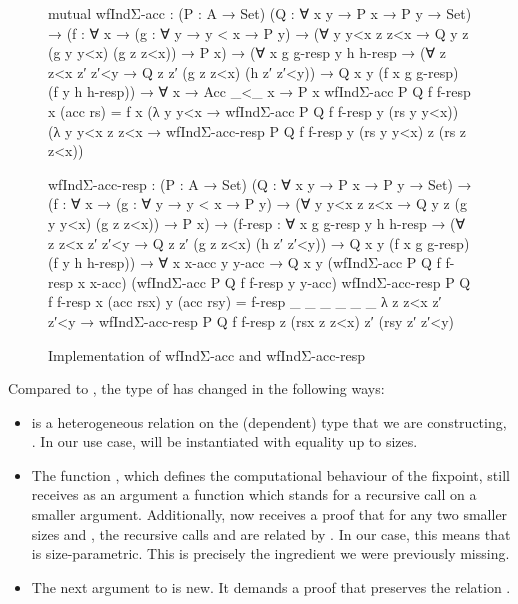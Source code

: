 \begin{figure}
  \centering
\begin{code}
mutual
  wfIndΣ-acc : (P : A → Set) (Q : ∀ x y → P x → P y → Set)
    → (f : ∀ x
        → (g : ∀ y → y < x → P y)
        → (∀ y y<x z z<x → Q y z (g y y<x) (g z z<x))
        → P x)
    → (∀ x g g-resp y h h-resp
        → (∀ z z<x z′ z′<y → Q z z′ (g z z<x) (h z′ z′<y))
        → Q x y (f x g g-resp) (f y h h-resp))
    → ∀ x → Acc _<_ x → P x
  wfIndΣ-acc P Q f f-resp x (acc rs)
    = f x
      (λ y y<x → wfIndΣ-acc P Q f f-resp y (rs y y<x))
      (λ y y<x z z<x
          → wfIndΣ-acc-resp P Q f f-resp y (rs y y<x) z (rs z z<x))

  wfIndΣ-acc-resp : (P : A → Set) (Q : ∀ x y → P x → P y → Set)
    → (f : ∀ x
        → (g : ∀ y → y < x → P y)
        → (∀ y y<x z z<x → Q y z (g y y<x) (g z z<x))
        → P x)
    → (f-resp : ∀ x g g-resp y h h-resp
        → (∀ z z<x z′ z′<y → Q z z′ (g z z<x) (h z′ z′<y))
        → Q x y (f x g g-resp) (f y h h-resp))
    → ∀ x x-acc y y-acc
    → Q x y
        (wfIndΣ-acc P Q f f-resp x x-acc)
        (wfIndΣ-acc P Q f f-resp y y-acc)
  wfIndΣ-acc-resp P Q f f-resp x (acc rsx) y (acc rsy)
    = f-resp _ _ _ _ _ _ λ z z<x z′ z′<y
        → wfIndΣ-acc-resp P Q f f-resp z (rsx z z<x) z′ (rsy z′ z′<y)
\end{code}

  \caption{Implementation of wfIndΣ-acc and wfIndΣ-acc-resp}
  \label{fig:wfIndΣ}
\end{figure}

Compared to , the type of  has changed in the
following ways:
\begin{itemize}
  \item {} is a heterogeneous relation on the (dependent) type that we
    are constructing, . In our use case,  will be instantiated
    with equality up to sizes.
  \item The function , which defines the computational behaviour of the
    fixpoint, still receives as an argument a function  which stands
    for a recursive call on a smaller argument. Additionally,  now
    receives a proof that for any two smaller sizes  and , the
    recursive calls  and  are related by . In our
    case, this means that  is size-parametric. This is precisely the
    ingredient we were previously missing.
  \item The next argument to  is new. It demands a proof that
     preserves the relation .
\end{itemize}

